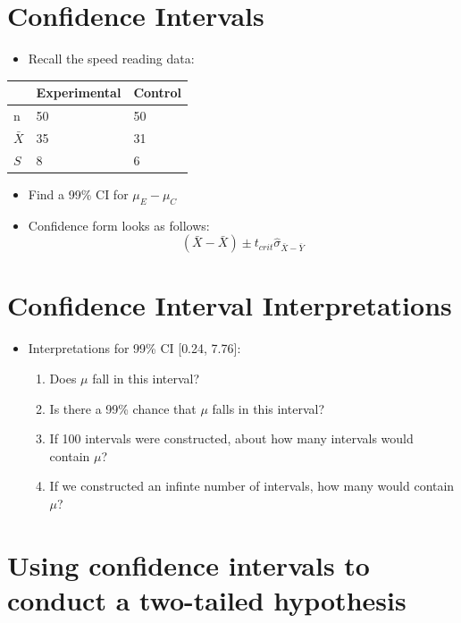 \documentclass[12pt]{article}
\begin{document}
\section{Confidence Intervals}\label{confidence-intervals}

\begin{itemize}
\itemsep1pt\parskip0pt
\item
  Recall the speed reading data:
\end{itemize}

\begin{longtable}[c]{@{}lll@{}}
\toprule
& Experimental & Control\tabularnewline
\midrule
\endhead
n & 50 & 50\tabularnewline
\(\bar{X}\) & 35 & 31\tabularnewline
\(S\) & 8 & 6\tabularnewline
\bottomrule
\end{longtable}

\begin{itemize}
\itemsep1pt\parskip0pt
\item
  Find a 99\% CI for \(\mu_{E} - \mu_{C}\)
\item
  Confidence form looks as follows:
  \[ (\bar{X} - \bar{X}) \pm t_{crit} \hat{\sigma}_{\bar{X} - \bar{Y}} \]
\end{itemize}

\section{Confidence Interval
Interpretations}\label{confidence-interval-interpretations}

\begin{itemize}
\itemsep1pt\parskip0pt
\item
  Interpretations for 99\% CI {[}0.24, 7.76{]}:

  \begin{enumerate}
  \def\labelenumi{\arabic{enumi}.}
  \itemsep1pt\parskip0pt
  \item
    Does \(\mu\) fall in this interval?
  \item
    Is there a 99\% chance that \(\mu\) falls in this interval?
  \item
    If 100 intervals were constructed, about how many intervals would
    contain \(\mu\)?
  \item
    If we constructed an infinte number of intervals, how many would
    contain \(\mu\)?
  \end{enumerate}
\end{itemize}

\section{Using confidence intervals to conduct a two-tailed
hypothesis}\label{using-confidence-intervals-to-conduct-a-two-tailed-hypothesis}
\end{document}
